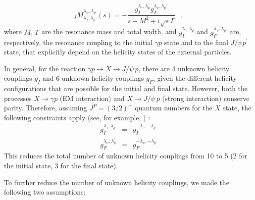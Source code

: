 \documentclass[a4paper,10pt]{article}
\begin{document}
\begin{equation}
_JM_{\lambda_\gamma,\lambda_p}^{\lambda_\psi,\lambda_{p^{\prime}}} (s) = - \frac{g^{\lambda_\gamma,\lambda_p}_{I} g^{\lambda_\psi,\lambda_{p^\prime}}_{F}}{s-M^2+i\sqrt{s}\Gamma} \; \; \; ,
\end{equation}
where $M$, $\Gamma$ are the resonance mass and total width, and $g^{\lambda_\gamma,\lambda_p}_{I}$ and $g^{\lambda_\psi,\lambda_{p^{\prime}}}_{F}$ are, respectively, the resonance coupling to the initial $\gamma p$ state and to the final $J/\psi p^{\prime}$ state, that explicitly depend on the helicity states of the external particles.

In general, for the reaction  $\gamma p \rightarrow X \rightarrow J/\psi \, p$, there are 4 unknown  helicity couplings $g_I$ and 6 unknown  helicity couplings $g_F$, given the different helicity configurations that are possible for the initial and final state. However, both the processes $X \rightarrow \gamma p$ (EM interaction) and $X \rightarrow J/\psi \, p$ (strong interaction) conserve parity. Therefore, assuming $J^P=(3/2)^-$ quantum numbers for the $X$ state, the following constraints apply (see, for example, \cite{Richman:1984gh}) :
\begin{eqnarray}
g^{\lambda_\gamma,\lambda_p}_{I} &=& g^{-\lambda_\gamma,-\lambda_p}_{I} \\
g^{\lambda_\psi,\lambda_p^\prime}_{F} &=& g^{-\lambda_\psi,-\lambda_{p^\prime}}_{F}
\end{eqnarray}
This reduces the total number of unknown helicity couplings from 10 to 5 (2 for the initial state, 3 for the final state).

To further reduce the number of unknown helicity couplings, we made the following two assumptions:
\end{document}
